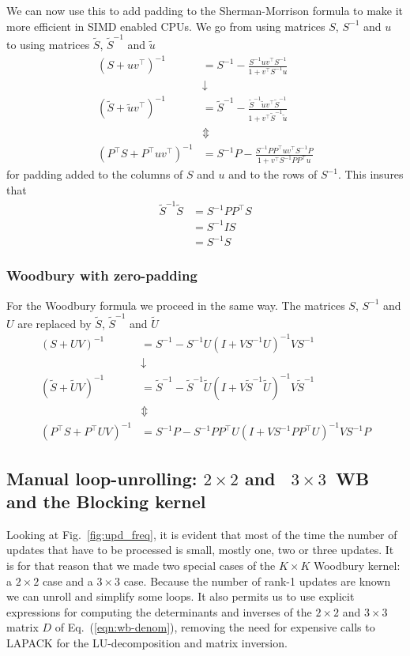\documentclass[11pt]{article}
\numberwithin{figure}{section}
\numberwithin{table}{section}
\begin{document}
We can now use this to add padding to the Sherman-Morrison formula to make it more efficient in SIMD enabled CPUs. We go from using matrices $S$, $S^{-1}$ and $u$ to using matrices $\widetilde{S}$, $\widetilde{S}^{-1}$ and $\widetilde{u}$
\begin{align}
	\left(S+uv^\top \right)^{-1} &= S^{-1}-\frac{S^{-1}uv^\top S^{-1}}{1+v^\top S^{-1}u} \\
								&\downarrow \\
	\left(\widetilde{S}+\widetilde{u}v^\top \right)^{-1} &= \widetilde{S}^{-1}-\frac{\widetilde{S}^{-1}\widetilde{u}v^\top \widetilde{S}^{-1}}{1+v^\top \widetilde{S}^{-1}\widetilde{u}} \\
								&\Updownarrow \\
	\left(P^\top S+P^\top uv^\top \right)^{-1} &= S^{-1}P-\frac{S^{-1}PP^\top uv^\top S^{-1}P}{1+v^\top S^{-1}PP^\top u}	
\end{align}
for padding added to the columns of $S$ and $u$ and to the rows of $S^{-1}$. This insures that
\begin{align}
	\widetilde{S}^{-1}\widetilde{S} &= S^{-1}PP^\top S \\
									&= S^{-1}IS \\
									&= S^{-1}S
\end{align}

\subsubsection{Woodbury with zero-padding}
For the Woodbury formula we proceed in the same way. The matrices $S$, $S^{-1}$ and $U$ are replaced by $\widetilde{S}$, $\widetilde{S}^{-1}$ and $\widetilde{U}$
\begin{align}
\left(S+UV\right)^{-1} &= S^{-1} - S^{-1}U(I+VS^{-1}U)^{-1}VS^{-1}\\
	&\downarrow \\
\left(\widetilde{S}+\widetilde{U}V\right)^{-1} &= \widetilde{S}^{-1} - \widetilde{S}^{-1}\widetilde{U}(I+V\widetilde{S}^{-1}\widetilde{U})^{-1}V\widetilde{S}^{-1} \\
		&\Updownarrow \\
\left(P^\top S+P^\top UV\right)^{-1} &= S^{-1}P - S^{-1}PP^\top U(I+VS^{-1}PP^\top U)^{-1}VS^{-1}P
\end{align}

			\subsection{Manual loop-unrolling: $2\times 2$ and ~$3\times 3$~WB and the Blocking kernel}
				Looking at Fig.~\ref{fig:upd_freq}, it is evident that most of the time the number of updates that have to be processed is small, mostly one, two or three updates. It is for that reason that we made two special cases of the $K\times K$ Woodbury kernel: a $2\times 2$ case and a $3\times 3$ case. Because the number of rank-1 updates are known we can unroll and simplify some loops. It also permits us to use explicit expressions for computing the determinants and inverses of the $2\times 2$ and $3\times 3$ matrix $D$ of Eq.~(\ref{eqn:wb-denom}), removing the need for expensive calls to LAPACK for the LU-decomposition and matrix inversion.\\
				
\end{document}
